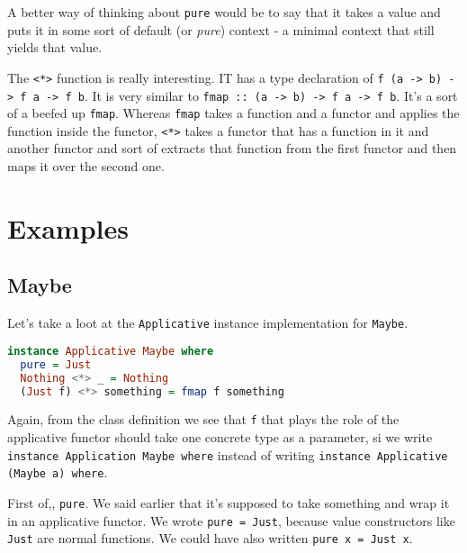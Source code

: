 A better way of thinking about \texttt{pure} would be to say that it takes a value and puts it in some sort of default (or  \textit{pure}) context - a minimal context that still yields that value. 
\linebreak \linebreak

The \texttt{<*>} function is really interesting. IT has a type declaration of \texttt{f (a -> b) -> f a -> f b}. It is very similar to \texttt{fmap :: (a -> b) -> f a -> f b}. It's a sort of a beefed up \texttt{fmap}. Whereas \texttt{fmap} takes a function and a functor and applies the function inside the functor, \texttt{<*>} takes a functor that has a function in it and another functor and sort of extracts that function from the first functor and then maps it over the second one. 
\linebreak \linebreak

\section{Examples}
\subsection{Maybe}
Let's take a loot at the \texttt{Applicative} instance implementation for \texttt{Maybe}.

\begin{lstlisting}[language=haskell]
instance Applicative Maybe where
  pure = Just
  Nothing <*> _ = Nothing
  (Just f) <*> something = fmap f something
\end{lstlisting}

Again, from the class definition we see that \texttt{f} that plays the role of the applicative functor should take one concrete type as a parameter, si we write \texttt{instance Application Maybe where} instead of writing \texttt{instance Applicative (Maybe a) where}.
\linebreak \linebreak

First of,, \texttt{pure}. We said earlier that it's supposed to take something and wrap it in an applicative functor. We wrote \texttt{pure = Just}, because value constructors like \texttt{Just} are normal functions. We could have also written \texttt{pure x = Just x}.
\linebreak \linebreak

